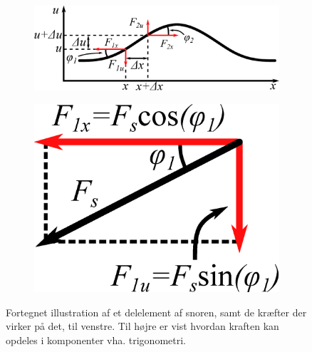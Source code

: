 \begin{figure}
    \begin{subfigure}[t]{.675\textwidth}
        \centering
        \includegraphics[width=\columnwidth]{Akustik/fig/snor.eps}
    \end{subfigure}
    \hfill
    \begin{subfigure}[t]{.225\textwidth}
        \centering
        \includegraphics[width=\columnwidth]{Akustik/fig/force.eps}
    \end{subfigure}
    \caption{Fortegnet illustration af et delelement af snoren, samt de kræfter der virker på det, til venstre. Til højre er vist hvordan kraften kan opdeles i komponenter vha. trigonometri.}
    \label{aku:fig:string_forces}
\end{figure}
%
